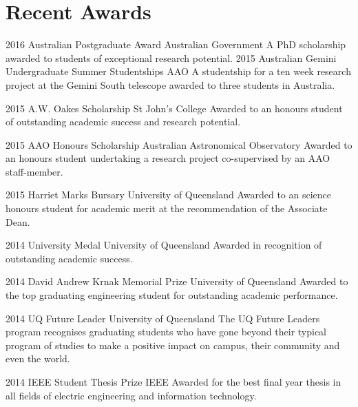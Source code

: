 \documentclass[]{friggeri-cv} %
\begin{document}
\section{Recent Awards}
\begin{entrylist}
\entry
{2016}
{Australian Postgraduate Award}
{Australian Government}
{A PhD scholarship awarded to students of exceptional research potential.}
\entry
{2015}
{Australian Gemini Undergraduate Summer Studentships}
{AAO}
{A studentship for a ten week research project at the Gemini South telescope awarded to three students in Australia.}
\end{entrylist}
\begin{entrylist}
\entry
{2015}
{A.W. Oakes Scholarship}
{St John's College}
{Awarded to an honours student of outstanding academic success and research potential.}
\end{entrylist}
\begin{entrylist}
\entry
{2015}
{AAO Honours Scholarship}
{Australian Astronomical Observatory}
{Awarded to an honours student undertaking a research project co-supervised by an AAO staff-member.}
\end{entrylist}
\begin{entrylist}
\entry
{2015}
{Harriet Marks Bursary}
{University of Queensland}
{Awarded to an science honours student for academic merit at the recommendation of the Associate Dean.}
\end{entrylist}
\begin{entrylist}
\entry
{2014}
{University Medal}
{University of Queensland}
{Awarded in recognition of outstanding academic success.}
\end{entrylist}
\begin{entrylist}
\entry
{2014}
{David Andrew Krnak Memorial Prize}
{University of Queensland}
{Awarded to the top graduating engineering student for outstanding academic performance.}
\end{entrylist}
\begin{entrylist}
\entry
{2014}
{UQ Future Leader}
{University of Queensland}
{The UQ Future Leaders program recognises graduating students who have gone beyond their typical program of studies to make a positive impact on campus, their community and even the world.}
\end{entrylist}
\begin{entrylist}
\entry
{2014}
{IEEE Student Thesis Prize}
{IEEE}
{Awarded for the best final year thesis in all fields of electric engineering and information technology.}
\end{entrylist}
\end{document}
